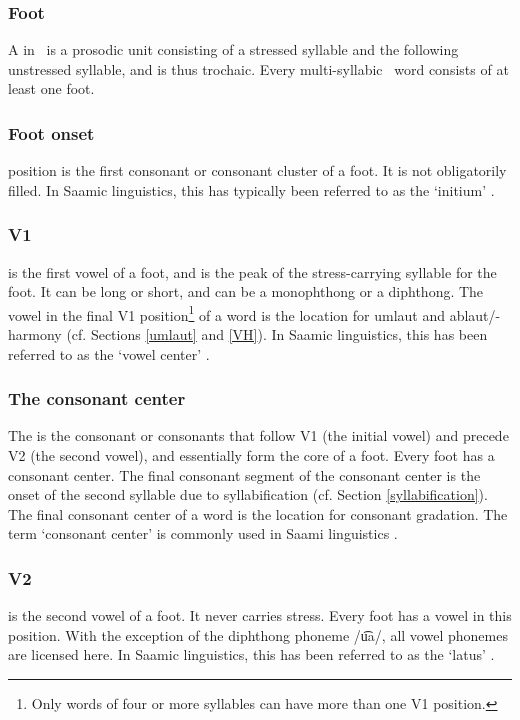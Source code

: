 \subsubsection{Foot}\label{foot}
A  in \PS\ is a prosodic unit consisting of a stressed syllable and the following unstressed syllable, and is thus trochaic. Every multi-syllabic \PS\ word consists of at least one foot. 

\subsubsection{Foot onset}\label{footOnset}
 position is the first consonant or consonant cluster of a foot. It is not obligatorily filled. 
In Saamic linguistics, this has typically been referred to as the ‘initium’ \citep[cf.][39]{Sammallahti1998}.

\subsubsection{V1}\label{v1}
 is the first vowel of a foot, and is the peak of the stress-carrying syllable for the foot. It can be long or short, and can be a monophthong or a diphthong. The vowel in the final V1 position\footnote{Only words of four or more syllables can have more than one V1 position.}
 of a word is the location for umlaut and ablaut/-harmony (cf. Sections \ref{umlaut} and \ref{VH}). 
In Saamic linguistics, this has been referred to as the ‘vowel center’ \citep[cf.][39]{Sammallahti1998}.

\subsubsection{The consonant center}\label{CCent}
The  is the consonant or consonants that follow V1 (the initial vowel) and precede V2 (the second vowel), and essentially form the core 
of a foot. Every foot has a consonant center. The final consonant segment of the consonant center is the onset of the second syllable due to syllabification (cf. Section \ref{syllabification}). The final consonant center of a word is the location for consonant gradation. The term ‘consonant center’ is commonly used in Saami linguistics \citep[cf.][39]{Sammallahti1998}. 

\subsubsection{V2}\label{v2}
 is the second vowel of a foot. It never carries stress. Every foot has a vowel in this position. With the exception of the diphthong phoneme /u͡a/, all vowel phonemes are licensed here. 
In Saamic linguistics, this has been referred to as the ‘latus’ \citep[cf.][39]{Sammallahti1998}.


